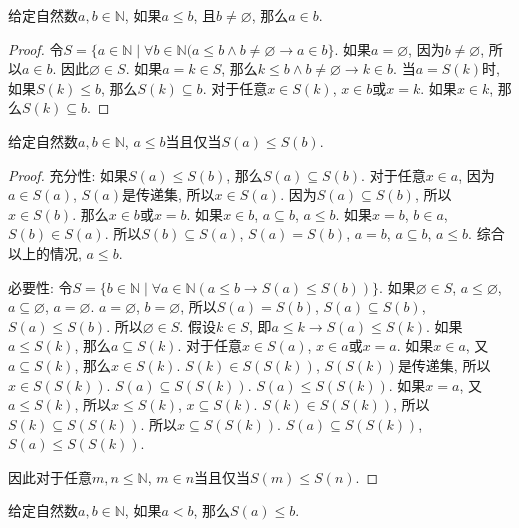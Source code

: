 \begin{proposition}
	给定自然数$a,b\in \mathbb N$, 如果$a\leqslant b$, 且$b\neq \varnothing$, 那么$a\in b$.
\end{proposition}

\begin{proof}
	 令$S=\{a\in \mathbb N\mid \forall b\in \mathbb N(a\leqslant b\wedge b\neq \varnothing \rightarrow a\in b\}$. 如果$a=\varnothing$, 因为$b\neq \varnothing$, 所以$a\in b$. 因此$\varnothing \in S$. 如果$a=k\in S$, 那么$k\leqslant b\wedge b\neq \varnothing \rightarrow k\in b$. 当$a=S(k)$时, 如果$S(k)\leqslant b$, 那么$S(k)\subseteq b$. 对于任意$x\in S(k)$, $x\in b$或$x=k$. 如果$x\in k$, 那么$S(k)\subseteq b$.
\end{proof}

\begin{proposition}
	给定自然数$a,b\in \mathbb N$, $a\leqslant b$当且仅当$S(a)\leqslant S(b)$.
\end{proposition}

\begin{proof}
	充分性: 如果$S(a)\leqslant S(b)$, 那么$S(a)\subseteq S(b)$. 对于任意$x\in a$, 因为$a\in S(a)$, $S(a)$是传递集, 所以$x\in S(a)$. 因为$S(a)\subseteq S(b)$, 所以$x\in S(b)$. 那么$x\in b$或$x=b$. 如果$x\in b$, $a\subseteq b$, $a\leqslant b$. 如果$x=b$, $b\in a$, $S(b)\in S(a)$. 所以$S(b)\subseteq S(a)$, $S(a)=S(b)$, $a=b$, $a\subseteq b$, $a\leqslant b$. 综合以上的情况, $a\leqslant b$.

	必要性: 令$S=\{b\in \mathbb N\mid \forall a\in \mathbb N(a\leqslant b\rightarrow S(a)\leqslant S(b))\}$. 如果$\varnothing \in S$, $a\leqslant \varnothing$, $a\subseteq \varnothing$, $a=\varnothing$. $a=\varnothing$, $b=\varnothing$, 所以$S(a)=S(b)$, $S(a)\subseteq S(b)$, $S(a)\leqslant S(b)$. 所以$\varnothing \in S$. 假设$k\in S$, 即$a\leqslant k\rightarrow S(a)\leqslant S(k)$. 如果$a\leqslant S(k)$, 那么$a\subseteq S(k)$. 对于任意$x\in S(a)$, $x\in a$或$x=a$. 如果$x\in a$, 又$a\subseteq S(k)$, 那么$x\in S(k)$. $S(k)\in S(S(k))$, $S(S(k))$是传递集, 所以$x\in S(S(k))$. $S(a)\subseteq S(S(k))$. $S(a)\leqslant S(S(k))$. 如果$x=a$, 又$a\leqslant S(k)$, 所以$x\leqslant S(k)$, $x\subseteq S(k)$. $S(k)\in S(S(k))$, 所以$S(k)\subseteq S(S(k))$. 所以$x\subseteq S(S(k))$. $S(a)\subseteq S(S(k))$, $S(a)\leqslant S(S(k))$.

	因此对于任意$m,n\leqslant \mathbb N$, $m\in n$当且仅当$S(m)\leqslant S(n)$.
\end{proof}

\begin{proposition}
	给定自然数$a,b\in \mathbb N$, 如果$a<b$, 那么$S(a)\leqslant b$.
\end{proposition}

